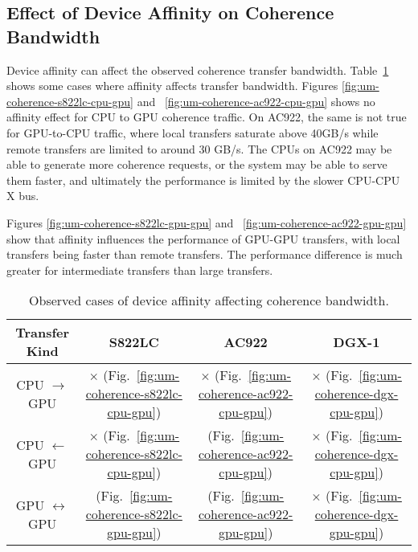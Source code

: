 \subsection{Effect of Device Affinity on Coherence Bandwidth}

Device affinity can affect the observed coherence transfer bandwidth.
Table~\ref{tab:um-coherence-affinity} shows some cases where affinity affects transfer bandwidth.
Figures \ref{fig:um-coherence-s822lc-cpu-gpu} and ~\ref{fig:um-coherence-ac922-cpu-gpu} shows no affinity effect for CPU to GPU coherence traffic.
On AC922, the same is not true for GPU-to-CPU traffic, where local transfers saturate above 40GB/s while remote transfers are limited to around 30 GB/s.
The CPUs on AC922 may be able to generate more coherence requests, or the system may be able to serve them faster, and ultimately the performance is limited by the slower CPU-CPU X bus.

Figures \ref{fig:um-coherence-s822lc-gpu-gpu} and ~\ref{fig:um-coherence-ac922-gpu-gpu} show that affinity influences the performance of GPU-GPU transfers, with local transfers being faster than remote transfers.
The performance difference is much greater for intermediate transfers than large transfers.

\begin{table}[ht]
	\centering
	\caption[Device Affinity and Coherence Bandwidth]{
		Observed cases of device affinity affecting coherence bandwidth.
	}
	\label{tab:um-coherence-affinity}
	\begin{tabular}{cccc}
		\hline
		\textbf{Transfer Kind}    & \textbf{S822LC}                                         & \textbf{AC922}                                         & \textbf{DGX-1}                            \\ \hline 
		CPU $\rightarrow$     GPU & $\times$   (Fig.~\ref{fig:um-coherence-s822lc-cpu-gpu}) & $\times$   (Fig.~\ref{fig:um-coherence-ac922-cpu-gpu}) & $\times$ (Fig.~\ref{fig:um-coherence-dgx-cpu-gpu}) \\ \hline
		CPU $\leftarrow$      GPU & $\times$   (Fig.~\ref{fig:um-coherence-s822lc-cpu-gpu}) & \checkmark (Fig.~\ref{fig:um-coherence-ac922-cpu-gpu}) & $\times$ (Fig.~\ref{fig:um-coherence-dgx-cpu-gpu}) \\ \hline
		GPU $\leftrightarrow$ GPU & \checkmark (Fig.~\ref{fig:um-coherence-s822lc-gpu-gpu}) & \checkmark (Fig.~\ref{fig:um-coherence-ac922-gpu-gpu}) & $\times$ (Fig.~\ref{fig:um-coherence-dgx-gpu-gpu}) \\ \hline
	\end{tabular}
\end{table}


